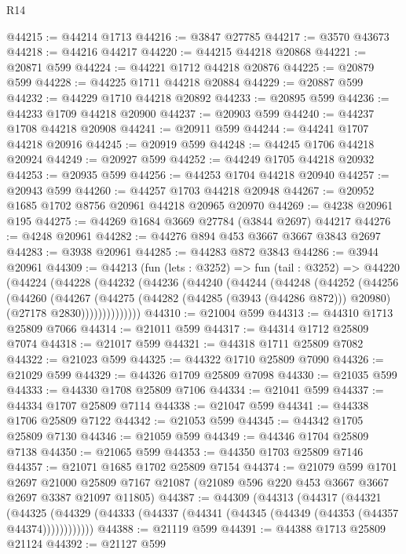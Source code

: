 \begin{lexlean}{R14}
\begin{coremodule}
@44215 := @44214 @1713
@44216 := @3847 @27785
@44217 := @3570 @43673
@44218 := @44216 @44217
@44220 := @44215 @44218 @20868
@44221 := @20871 @599
@44224 := @44221 @1712 @44218 @20876
@44225 := @20879 @599
@44228 := @44225 @1711 @44218 @20884
@44229 := @20887 @599
@44232 := @44229 @1710 @44218 @20892
@44233 := @20895 @599
@44236 := @44233 @1709 @44218 @20900
@44237 := @20903 @599
@44240 := @44237 @1708 @44218 @20908
@44241 := @20911 @599
@44244 := @44241 @1707 @44218 @20916
@44245 := @20919 @599
@44248 := @44245 @1706 @44218 @20924
@44249 := @20927 @599
@44252 := @44249 @1705 @44218 @20932
@44253 := @20935 @599
@44256 := @44253 @1704 @44218 @20940
@44257 := @20943 @599
@44260 := @44257 @1703 @44218 @20948
@44267 := @20952 @1685 @1702 @8756 @20961 @44218 @20965 @20970
@44269 := @4238 @20961 @195
@44275 := @44269 @1684 @3669 @27784 (@3844 @2697) @44217
@44276 := @4248 @20961
@44282 := @44276 @894 @453 @3667 @3667 @3843 @2697
@44283 := @3938 @20961
@44285 := @44283 @872 @3843
@44286 := @3944 @20961
@44309 := @44213
    (fun (lets : @3252) =>
    fun (tail : @3252) =>
    @44220
      (@44224
        (@44228
          (@44232
            (@44236
              (@44240
                (@44244
                  (@44248
                    (@44252
                      (@44256
                        (@44260
                          (@44267
                            (@44275
                              (@44282 (@44285 (@3943 (@44286 @872))) @20980)
                              (@27178 @2830))))))))))))))
@44310 := @21004 @599
@44313 := @44310 @1713 @25809 @7066
@44314 := @21011 @599
@44317 := @44314 @1712 @25809 @7074
@44318 := @21017 @599
@44321 := @44318 @1711 @25809 @7082
@44322 := @21023 @599
@44325 := @44322 @1710 @25809 @7090
@44326 := @21029 @599
@44329 := @44326 @1709 @25809 @7098
@44330 := @21035 @599
@44333 := @44330 @1708 @25809 @7106
@44334 := @21041 @599
@44337 := @44334 @1707 @25809 @7114
@44338 := @21047 @599
@44341 := @44338 @1706 @25809 @7122
@44342 := @21053 @599
@44345 := @44342 @1705 @25809 @7130
@44346 := @21059 @599
@44349 := @44346 @1704 @25809 @7138
@44350 := @21065 @599
@44353 := @44350 @1703 @25809 @7146
@44357 := @21071 @1685 @1702 @25809 @7154
@44374 := @21079
    @599
    @1701
    @2697
    @21000
    @25809
    @7167
    @21087
    (@21089 @596 @220 @453 @3667 @3667 @2697 @3387 @21097 @11805)
@44387 := @44309
    (@44313
      (@44317
        (@44321
          (@44325 (@44329 (@44333 (@44337 (@44341 (@44345 (@44349 (@44353 (@44357 @44374))))))))))))
@44388 := @21119 @599
@44391 := @44388 @1713 @25809 @21124
@44392 := @21127 @599

\end{coremodule}
\end{lexlean}

